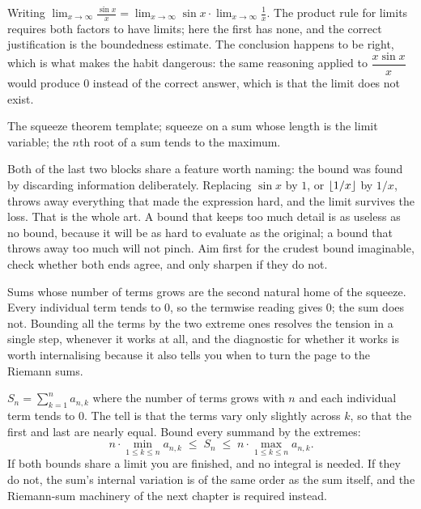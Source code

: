 \begin{trap}
Writing $\displaystyle\lim_{x\to\infty}\frac{\sin x}{x}=\lim_{x\to\infty}\sin x\cdot\lim_{x\to\infty}\frac1x$. The product rule for limits requires both factors to have limits; here the first has none, and the correct justification is the boundedness estimate. The conclusion happens to be right, which is what makes the habit dangerous: the same reasoning applied to $\dfrac{x\sin x}{x}$ would produce $0$ instead of the correct answer, which is that the limit does not exist.
\end{trap}

\begin{seealsob}The squeeze theorem template; squeeze on a sum whose length is the limit variable; the $n$th root of a sum tends to the maximum.\end{seealsob}

Both of the last two blocks share a feature worth naming: the bound was found by discarding information deliberately. Replacing $\sin x$ by $1$, or $\left\lfloor 1/x\right\rfloor$ by $1/x$, throws away everything that made the expression hard, and the limit survives the loss. That is the whole art. A bound that keeps too much detail is as useless as no bound, because it will be as hard to evaluate as the original; a bound that throws away too much will not pinch. Aim first for the crudest bound imaginable, check whether both ends agree, and only sharpen if they do not.

Sums whose number of terms grows are the second natural home of the squeeze. Every individual term tends to $0$, so the termwise reading gives $0$; the sum does not. Bounding all the terms by the two extreme ones resolves the tension in a single step, whenever it works at all, and the diagnostic for whether it works is worth internalising because it also tells you when to turn the page to the Riemann sums.

\cue $S_{n}=\sum_{k=1}^{n}a_{n,k}$ where the number of terms grows with $n$ and each individual term tends to $0$. The tell is that the terms vary only slightly across $k$, so that the first and last are nearly equal.
\method Bound every summand by the extremes:
\[n\cdot\min_{1\leq k\leq n}a_{n,k}\;\leq\;S_{n}\;\leq\;n\cdot\max_{1\leq k\leq n}a_{n,k}.\]
If both bounds share a limit you are finished, and no integral is needed. If they do not, the sum's internal variation is of the same order as the sum itself, and the Riemann-sum machinery of the next chapter is required instead.

